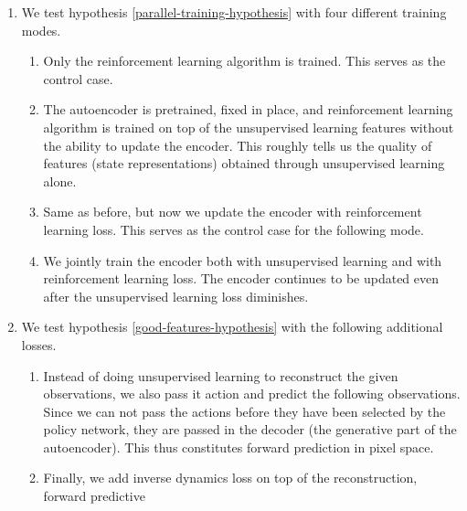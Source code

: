 \begin{enumerate}
		\item We test hypothesis \ref{parallel-training-hypothesis} with four different training modes.
		\begin{enumerate}
				\item Only the reinforcement learning algorithm is trained. This serves as 
						the control case.
				\item The autoencoder is pretrained, fixed in place, and reinforcement learning
						algorithm is trained on top of the unsupervised learning features
						without the ability to update the encoder. 
						This roughly tells us the quality of features (state representations) 
						obtained through unsupervised learning alone. \label{test-ae-fixed}
				\item Same as before, but now we update the encoder with reinforcement learning loss.
						This serves as the control case for the following mode.
				\item We jointly train the encoder both with unsupervised learning and with
						reinforcement learning loss. The encoder continues to be updated
						even after the unsupervised learning loss diminishes.
		\end{enumerate}
\item We test hypothesis \ref{good-features-hypothesis} with the following additional losses.
		\begin{enumerate}
				\item Instead of doing unsupervised learning to reconstruct the given observations,
						we also pass it action and predict the following observations.
						Since we can not pass the actions before they have been selected by the policy network,
						they are passed in the decoder (the generative part of the autoencoder).
						This thus constitutes forward prediction in pixel space.
				\item Finally, we add inverse dynamics loss on top of the reconstruction, forward predictive 

\end{enumerate}
\end{enumerate}
